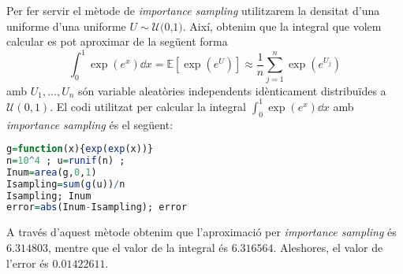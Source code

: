 \documentclass[11pt,a4paper]{article}
\begin{document}
Per fer servir el mètode de \textit{importance sampling} utilitzarem la densitat d'una uniforme d'una uniforme $U\sim \mathcal{U}\text{(0,1)}$. Així, obtenim que la integral que volem calcular es pot aproximar de la següent forma
$$\int_{0}^1 \exp(e^x)\dd x=\mathbb{E}[\exp(e^U)]\approx \frac{1}{n}\sum_{j=1}^n \exp(e^{U_j})$$
amb $U_1,\dots,U_n$ són variable aleatòries independents idènticament distribuïdes a $\mathcal{U}(0,1)$.
El codi utilitzat per calcular la integral $\int_{0}^{1}\exp(e^x)\dd x$ amb \textit{importance sampling} és el següent:

\begin{lstlisting}[language=R, caption={Programa del problema 5},xleftmargin=.08\textwidth,xrightmargin=.08\textwidth]
g=function(x){exp(exp(x))}
n=10^4 ; u=runif(n) ; 
Inum=area(g,0,1)
Isampling=sum(g(u))/n
Isampling; Inum
error=abs(Inum-Isampling); error
\end{lstlisting}
A través d'aquest mètode obtenim que l'aproximació per \textit{importance sampling} és $6.314803$, mentre que el valor de la integral és $6.316564$. Aleshores, el valor de l'error és $0.01422611$.
\end{document}
